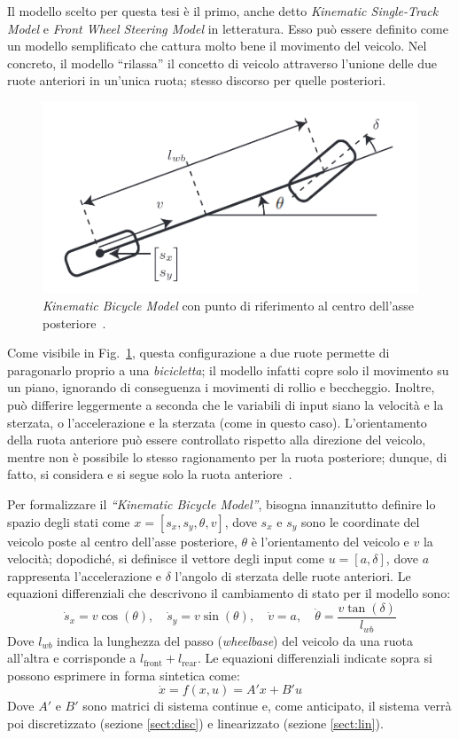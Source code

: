 Il modello scelto per questa tesi è il primo, anche detto \textit{Kinematic Single-Track Model} e \textit{Front Wheel Steering Model} in letteratura. 
Esso può essere definito come un modello semplificato che cattura molto bene il movimento del veicolo.
Nel concreto, il modello ``rilassa'' il concetto di veicolo attraverso l'unione delle due ruote 
anteriori in un'unica ruota; stesso discorso per quelle posteriori. 
\begin{figure}[H]
    \centering
    \includegraphics[scale=0.8]{images/kin_model.png}
    \caption{\textit{Kinematic Bicycle Model} con punto di riferimento al centro dell'asse posteriore~\cite{Althoff2017a}.}
    \label{fig:fig10} %
\end{figure}
Come visibile in Fig.~\ref{fig:fig10}, questa configurazione a due ruote permette di paragonarlo proprio a una \textit{bicicletta}; il modello infatti copre solo il movimento su un piano, 
ignorando di conseguenza i movimenti di rollio e beccheggio. Inoltre, può differire leggermente
a seconda che le variabili di input siano la velocità e la sterzata, o l'accelerazione e la sterzata (come in questo caso).
L'orientamento della ruota anteriore può essere controllato rispetto alla 
direzione del veicolo, mentre non è possibile lo stesso ragionamento
per la ruota posteriore; dunque, di fatto, si considera e si segue solo la ruota anteriore~\cite{Althoff2017a}.

Per formalizzare il \textit{``Kinematic Bicycle Model''}, bisogna 
innanzitutto definire lo spazio degli stati come 
$x=[s_x, s_y, \theta, v]$, dove $s_x$ e $s_y$ sono
le coordinate del veicolo poste al centro dell'asse posteriore, 
$\theta$ è l'orientamento del veicolo e $v$ la velocità; dopodiché, si
definisce il vettore degli input come $u=[a, \delta]$, dove $a$ 
rappresenta l'accelerazione e $\delta$ l'angolo di sterzata delle 
ruote anteriori.
Le equazioni differenziali che descrivono il cambiamento di stato per il modello sono:
\[
\dot{s}_x=v\cos(\theta), \quad
\dot{s}_y=v\sin(\theta), \quad
\dot{v}=a, \quad
\dot{\theta}=\frac{v\tan(\delta)}{l_{wb}}
\]
Dove $l_{wb}$ indica la lunghezza del passo (\textit{wheelbase}) del 
veicolo da una ruota all'altra e corrisponde a 
$l_\text{front} + l_\text{rear}$. 
Le equazioni differenziali indicate sopra si possono esprimere in 
forma sintetica come:
\[ \dot{x} = f(x, u) = A'x + B'u \]
Dove $A'$ e $B'$ sono matrici di sistema continue e, come anticipato, il sistema verrà poi discretizzato (sezione \ref{sect:disc}) e linearizzato (sezione \ref{sect:lin}).

